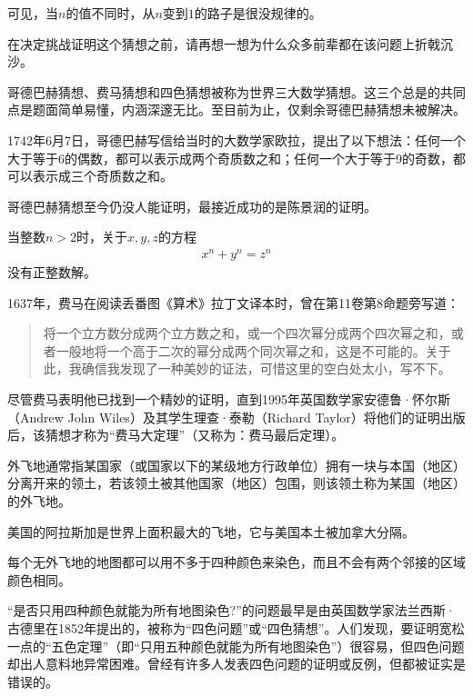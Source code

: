可见，当$n$的值不同时，从$n$变到$1$的路子是很没规律的。

在决定挑战证明这个猜想之前，请再想一想为什么众多前辈都在该问题上折戟沉沙。


哥德巴赫猜想、费马猜想和四色猜想被称为世界三大数学猜想。这三个总是的共同点是题面简单易懂，内涵深邃无比。至目前为止，仅剩余哥德巴赫猜想未被解决。

\begin{example}[哥德巴赫猜想]
  1742年6月7日，哥德巴赫写信给当时的大数学家欧拉，提出了以下想法：任何一个大于等于6的偶数，都可以表示成两个奇质数之和；任何一个大于等于9的奇数，都可以表示成三个奇质数之和。
\end{example}

哥德巴赫猜想至今仍没人能证明，最接近成功的是陈景润的证明。

\begin{example}
  当整数$n>2$时，关于$x,y,z$的方程
  \begin{align*}
    x^n+y^n=z^n
  \end{align*}
  没有正整数解。
\end{example}
1637年，费马在阅读丢番图《算术》拉丁文译本时，曾在第11卷第8命题旁写道：

\begin{quotation}
  将一个立方数分成两个立方数之和，或一个四次幂分成两个四次幂之和，或者一般地将一个高于二次的幂分成两个同次幂之和，这是不可能的。关于此，我确信我发现了一种美妙的证法，可惜这里的空白处太小，写不下。
\end{quotation}

尽管费马表明他已找到一个精妙的证明，直到1995年英国数学家安德鲁·怀尔斯（Andrew John Wiles）及其学生理查·泰勒（Richard Taylor）将他们的证明出版后，该猜想才称为“费马大定理”（又称为：费马最后定理）。


\begin{definition}
  外飞地通常指某国家（或国家以下的某级地方行政单位）拥有一块与本国（地区）分离开来的领土，若该领土被其他国家（地区）包围，则该领土称为某国（地区）的外飞地。
\end{definition}

美国的阿拉斯加是世界上面积最大的飞地，它与美国本土被加拿大分隔。

\begin{example}
  每个无外飞地的地图都可以用不多于四种颜色来染色，而且不会有两个邻接的区域颜色相同。
\end{example}

“是否只用四种颜色就能为所有地图染色?”的问题最早是由英国数学家法兰西斯·古德里在1852年提出的，被称为“四色问题”或“四色猜想”。人们发现，要证明宽松一点的“五色定理”（即“只用五种颜色就能为所有地图染色”）很容易，但四色问题却出人意料地异常困难。曾经有许多人发表四色问题的证明或反例，但都被证实是错误的。


